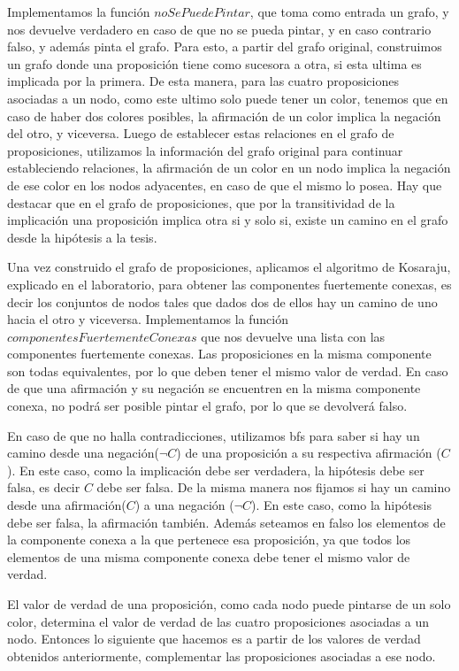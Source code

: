 Implementamos la función $ noSePuedePintar $, que toma como entrada un grafo, y nos devuelve verdadero en caso de que no se pueda pintar, y en caso contrario falso, y además pinta el grafo. Para esto, a partir del grafo original, construimos un grafo donde una proposición tiene como sucesora a otra, si esta ultima es implicada por la primera. De esta manera, para las cuatro proposiciones asociadas a un nodo, como este ultimo solo puede tener un color, tenemos que en caso de haber dos colores posibles, la afirmación de un color implica la negación del otro, y viceversa. Luego de establecer estas relaciones en el grafo de proposiciones, utilizamos la información del grafo original para continuar estableciendo relaciones, la afirmación de un color en un nodo implica la negación de ese color en los nodos adyacentes, en caso de que el mismo lo posea. Hay que destacar que en el grafo de proposiciones, que por la transitividad de la implicación una proposición implica otra si y solo si, existe un camino en el grafo desde la hipótesis a la tesis.

Una vez construido el grafo de proposiciones, aplicamos el algoritmo de Kosaraju, explicado en el laboratorio, para obtener las componentes fuertemente conexas, es decir los conjuntos de nodos tales que dados dos de ellos hay un camino de uno hacia el otro y viceversa. Implementamos la función $ componentesFuertementeConexas $ que nos devuelve una lista con las componentes fuertemente conexas. Las proposiciones en la misma componente son todas equivalentes, por lo que deben tener el mismo valor de verdad. En caso de que una afirmación y su negación se encuentren en la misma componente conexa, no podrá ser posible pintar el grafo, por lo que se devolverá falso. 

En caso de que no halla contradicciones, utilizamos bfs para saber si hay un camino desde una negación($ \neg C $) de una proposición a su respectiva afirmación ($ C $). En este caso, como la implicación debe ser verdadera, la hipótesis debe ser falsa, es decir $ C $ debe ser falsa. De la misma manera nos fijamos si hay un camino desde una afirmación($ C $) a una negación ($ \neg C $). En este caso, como la hipótesis debe ser falsa, la afirmación también. Además seteamos en falso los elementos de la componente conexa a la que pertenece esa proposición, ya que todos los elementos de una misma componente conexa debe tener el mismo valor de verdad. 

El valor de verdad de una proposición, como cada nodo puede pintarse de un solo color, determina el valor de verdad de las cuatro proposiciones asociadas a un nodo. Entonces lo siguiente que hacemos es a partir de los valores de verdad obtenidos anteriormente, complementar las proposiciones asociadas a ese nodo.


